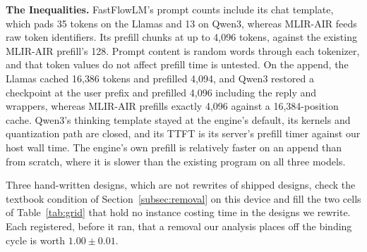 \textbf{The Inequalities.}
FastFlowLM's prompt counts include its chat template, which pads 35 tokens on the Llamas and 13 on Qwen3, whereas MLIR-AIR feeds raw token identifiers.
Its prefill chunks at up to 4{,}096 tokens, against the existing MLIR-AIR prefill's 128.
Prompt content is random words through each tokenizer, and that token values do not affect prefill time is untested.
On the append, the Llamas cached 16{,}386 tokens and prefilled 4{,}094, and Qwen3 restored a checkpoint at the user prefix and prefilled 4{,}096 including the reply and wrappers, whereas MLIR-AIR prefills exactly 4{,}096 against a 16{,}384-position cache.
Qwen3's thinking template stayed at the engine's default, its kernels and quantization path are closed, and its TTFT is its server's prefill timer against our host wall time.
The engine's own prefill is relatively faster on an append than from scratch, where it is slower than the existing program on all three models.

Three hand-written designs, which are not rewrites of shipped designs, check the textbook condition of Section~\ref{subsec:removal} on this device and fill the two cells of Table~\ref{tab:grid} that hold no instance costing time in the designs we rewrite.
Each registered, before it ran, that a removal our analysis places off the binding cycle is worth $1.00 \pm 0.01$.

